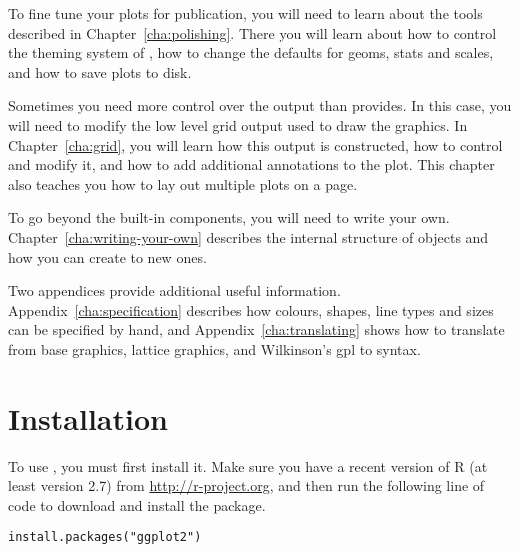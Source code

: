 To fine tune your plots for publication, you will need to learn about the tools described in Chapter~\ref{cha:polishing}.  There you will learn about how to control the theming system of \ggplot, how to change the defaults for geoms, stats and scales, and how to save plots to disk.

Sometimes you need more control over the output than \ggplot provides.  In this case, you will need to modify the low level grid output used to draw the graphics.  In Chapter~\ref{cha:grid}, you will learn how this output is constructed, how to control and modify it, and how to add additional annotations to the plot.  This chapter also teaches you how to lay out multiple plots on a page.

To go beyond the built-in components, you will need to write your own. Chapter~\ref{cha:writing-your-own} describes the internal structure of \ggplot objects and how you can create to new ones.

Two appendices provide additional useful information.  Appendix~\ref{cha:specification} describes how colours, shapes, line types and sizes can be specified by hand, and Appendix~\ref{cha:translating} shows how to translate from base graphics, lattice graphics, and Wilkinson's {\sc gpl} to \ggplot syntax.

\section{Installation}\label{sub:installation}

To use \ggplot, you must first install it. Make sure you have a recent version of R (at least version 2.7) from \url{http://r-project.org}, and then run the following line of code to download and install the \ggplot package.  

\begin{verbatim}
install.packages("ggplot2")
\end{verbatim}

% 
% 
% 

